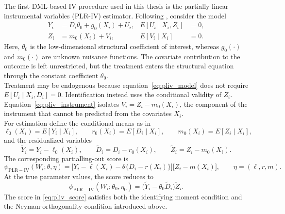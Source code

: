 \documentclass[12pt, a4paper, oneside]{article}
\theoremstyle{plain}
\theoremstyle{definition}
\begin{document}
The first DML-based IV procedure used in this thesis is the partially linear
instrumental variables (PLR-IV) estimator. Following
\citet[Section~4.2]{chernozhukov2018double}, consider the model
\begin{align}
    Y_i &= D_i\theta_0+g_0(X_i)+U_i,
    & E[U_i\mid X_i,Z_i]&=0, \label{eq:pliv_model}\\
    Z_i &= m_0(X_i)+V_i,
    & E[V_i\mid X_i]&=0. \label{eq:pliv_instrument}
\end{align}
Here, $\theta_0$ is the low-dimensional structural coefficient of interest,
whereas $g_0(\cdot)$ and $m_0(\cdot)$ are unknown nuisance functions.
The
covariate contribution to the outcome is left unrestricted, but the treatment
enters the structural equation through the constant coefficient $\theta_0$.\\
Treatment may be endogenous because equation~\eqref{eq:pliv_model} does not require
$E[U_i\mid X_i,D_i]=0$. Identification instead uses the conditional validity of
$Z_i$. Equation~\eqref{eq:pliv_instrument} isolates
$V_i=Z_i-m_0(X_i)$, the component of the instrument that cannot be predicted
from the covariates $X_i$.\\
For estimation define the conditional means as in \citet{chernozhukov2018double}
\begin{equation}
    \ell_0(X_i)=E[Y_i\mid X_i],\qquad
    r_0(X_i)=E[D_i\mid X_i],\qquad
    m_0(X_i)=E[Z_i\mid X_i],
    \label{eq:pliv_nuisances}
\end{equation}
and the residualized variables
\begin{equation}
    \widetilde Y_i=Y_i-\ell_0(X_i),\qquad
    \widetilde D_i=D_i-r_0(X_i),\qquad
    \widetilde Z_i=Z_i-m_0(X_i).
    \label{eq:pliv_residuals}
\end{equation}
The corresponding partialling-out score is
\begin{equation}
    \psi_{\mathrm{PLR-IV}}(W_i;\theta,\eta)
    =
    \big[Y_i-\ell(X_i)-\theta\{D_i-r(X_i)\}\big]
    \big[Z_i-m(X_i)\big],
    \qquad \eta=(\ell,r,m).
    \label{eq:pliv_score}
\end{equation}
At the true parameter values, the score reduces to
\begin{equation}
    \psi_{\mathrm{PLR-IV}}(W_i;\theta_0,\eta_0)
    =\big(\widetilde Y_i-\theta_0\widetilde D_i\big)
      \widetilde Z_i.
\end{equation}
The score in \eqref{eq:pliv_score} satisfies both the identifying moment
condition and the Neyman-orthogonality condition introduced above. \\
\end{document}
